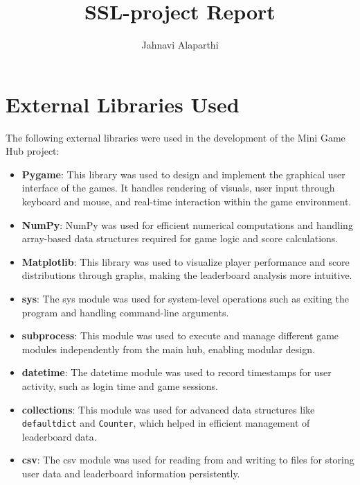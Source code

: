 \documentclass{article}
\title{SSL-project Report}
\author{Jahnavi Alaparthi}
\begin{document}
\maketitle

\section{External Libraries Used}

The following external libraries were used in the development of the Mini Game Hub project:

\begin{itemize}

\item \textbf{Pygame}: This library was used to design and implement the graphical user interface of the games. It handles rendering of visuals, user input through keyboard and mouse, and real-time interaction within the game environment.

\item \textbf{NumPy}: NumPy was used for efficient numerical computations and handling array-based data structures required for game logic and score calculations.

\item \textbf{Matplotlib}: This library was used to visualize player performance and score distributions through graphs, making the leaderboard analysis more intuitive.

\item \textbf{sys}: The sys module was used for system-level operations such as exiting the program and handling command-line arguments.

\item \textbf{subprocess}: This module was used to execute and manage different game modules independently from the main hub, enabling modular design.

\item \textbf{datetime}: The datetime module was used to record timestamps for user activity, such as login time and game sessions.

\item \textbf{collections}: This module was used for advanced data structures like \texttt{defaultdict} and \texttt{Counter}, which helped in efficient management of leaderboard data.

\item \textbf{csv}: The csv module was used for reading from and writing to files for storing user data and leaderboard information persistently.

\end{itemize}
\end{document}

